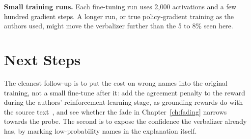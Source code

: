 \textbf{Small training runs.} Each fine-tuning run uses 2{,}000 activations and a few hundred gradient steps.
A longer run, or true policy-gradient training as the authors used, might move the verbalizer further than
the 5 to 8\% seen here.

\section{Next Steps}

The cleanest follow-up is to put the cost on wrong names into the original training, not a small fine-tune
after it: add the agreement penalty to the reward during the authors' reinforcement-learning stage, as
grounding rewards do with the source text~\cite{hong2026grounding}, and see whether the fade in
Chapter~\ref{ch:fading} narrows towards the probe. The second is to expose the
confidence the verbalizer already has, by marking low-probability names in the explanation itself.
